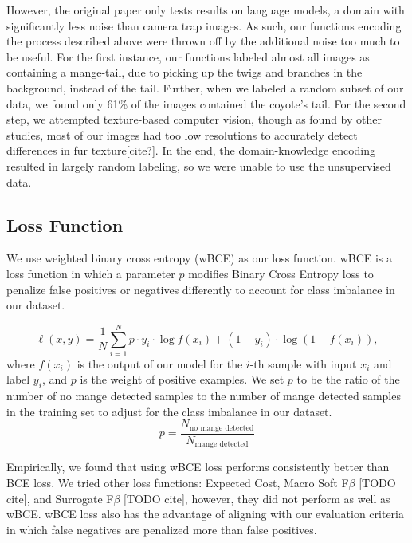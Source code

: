 \documentclass{article}
\begin{document}
However, the original paper only tests results on language models, a domain with
significantly less noise than camera trap images. As such, our functions
encoding the process described above were thrown off by the additional noise too
much to be useful. For the first instance, our functions labeled almost all
images as containing a mange-tail, due to picking up the twigs and branches in
the background, instead of the tail. Further, when we labeled a random subset of
our data, we found only 61\% of the images contained the coyote’s tail. For the
second step, we attempted texture-based computer vision, though as found by
other studies, most of our images had too low resolutions to accurately detect
differences in fur texture[cite?]. In the end, the domain-knowledge encoding
resulted in largely random labeling, so we were unable to use the unsupervised
data.

\subsection{Loss Function}

We use weighted binary cross entropy (wBCE) as our loss function.
wBCE is a loss function in which a parameter $p$ modifies Binary
Cross Entropy loss to penalize false positives or negatives differently to
account for class imbalance in our dataset.

  \begin{equation}
  \ell(x, y) = \frac{1}{N}\sum_{i = 1}^N p \cdot y_i \cdot \log f(x_i)
+ (1 - y_i) \cdot \log (1 - f(x_i)),
\end{equation}
where $f(x_i)$ is the output of our model for the $i$-th sample with input $x_i$
and label $y_i$, and $p$ is the weight of positive examples.
We set $p$ to be the ratio of the number of no mange detected samples to the
number of mange detected samples in the training set to adjust for the class
imbalance in our dataset.
\begin{equation}
  p = \frac{N_{\text{no mange detected}}}{N_{\text{mange detected}}}
\end{equation}

Empirically, we found that using wBCE loss performs consistently better than BCE
loss. We tried other loss functions: Expected Cost, Macro Soft F$\beta$ [TODO
cite], and Surrogate F$\beta$ [TODO cite], however, they did not perform as well
as wBCE. wBCE loss also has the advantage of aligning with our evaluation
criteria in which false negatives are penalized more than false positives.
\end{document}
